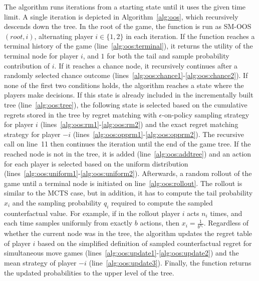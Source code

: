{The algorithm runs iterations from a starting state until it uses the given time limit. A single iteration is depicted in Algorithm~\ref{alg:oos},
which recursively descends down the tree. In the root of the game, the function is run as SM-OOS$(root, i)$, alternating player $i\in\{1,2\}$ in
each iteration. If the function reaches a terminal history of the game (line~\ref{alg:oos:terminal}), it returns the utility of the terminal node
for player $i$, and $1$ for both the tail and sample probability contribution of $i$. If it reaches a chance node, it recursively continues after
a randomly selected chance outcome (lines~\ref{alg:oos:chance1}-\ref{alg:oos:chance2}). If none of the first two conditions holds, the algorithm
reaches a state where the players make decisions. If this state is already included in the incrementally built tree (line~\ref{alg:oos:tree}), the
following state is selected based on the cumulative regrets stored in the tree by regret matching with $\epsilon$-on-policy sampling strategy for
player $i$ (lines~\ref{alg:oos:rm1}-\ref{alg:oos:rm2}) and the exact regret matching strategy for player $-i$ (lines~\ref{alg:oos:opprm1}-\ref{alg:oos:opprm2}).
The recursive call on line~11 then continues the iteration until the end of the game tree. If the reached node is not in the tree,
it is added (line~\ref{alg:oos:addtree}) and an action for each player is selected based on the uniform distribution
(lines~\ref{alg:oos:uniform1}-\ref{alg:oos:uniform2}). Afterwards, a random rollout of the game until a terminal node is initiated on line~\ref{alg:oos:rollout}.
The rollout is similar to the MCTS case, but in addition, it has to compute the tail probability $x_i$ and the sampling probability $q_i$
required to compute the sampled counterfactual value.
For example, if in the rollout player $i$ acts $n_i$ times, and each time samples uniformly from exactly $b$ actions, then $x_i = \frac{1}{b^{n_i}}$.
Regardless of whether the current node was in the tree, the algorithm updates the regret table of player $i$ based on the simplified definition of sampled counterfactual regret for simultaneous move games (lines~\ref{alg:oos:update1}-\ref{alg:oos:update2}) and the mean strategy of player $-i$ (line~\ref{alg:oos:update3}).
Finally, the function returns the updated probabilities to the upper level of the tree.

}
